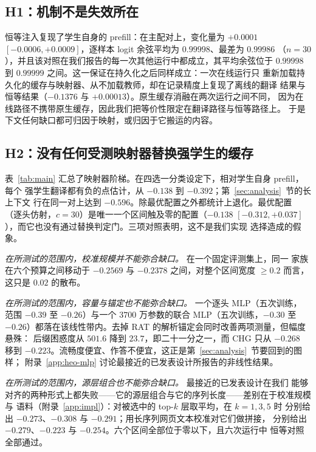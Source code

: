 \documentclass[10pt,a4paper,fontset=fandol]{ctexart}
\begin{document}
\subsection{H1：机制不是失效所在}
\label{sec:h1}

恒等注入复现了学生自身的 prefill：在主配对上，变化量为 $+0.0001$
$[-0.0006,+0.0009]$，逐样本 logit 余弦平均为 $0.99998$、最差为 $0.99986$
（$n{=}30$），并且该对照在我们报告的每一次其他运行中都成立，其平均余弦位于
$0.99998$ 到 $0.99999$ 之间。这一保证在持久化之后同样成立：一次在线运行只
重新加载持久化的缓存与映射器、从不加载教师，却在记录精度上复现了离线的翻译
结果与恒等结果（$-0.1376$ 与 $+0.00013$）。原生缓存消融在两次运行之间不同，
因为在线路径不携带原生缓存，因此我们把等价性限定在翻译路径与恒等路径上。
于是下文任何缺口都可归因于映射，或归因于它搬运的内容。

\subsection{H2：没有任何受测映射器替换强学生的缓存}
\label{sec:h2}

表~\ref{tab:main} 汇总了映射器阶梯。在四选一分类设定下，相对学生自身 prefill，每个
强学生翻译都有负的点估计，从 $-0.138$ 到 $-0.392$；第~\ref{sec:analysis}~节的长上下文
行在同一对上达到 $-0.596$。除最优配置之外都统计上退化。最优配置
（逐头仿射，$c{=}30$）是唯一一个区间触及零的配置（$-0.138$
$[-0.312,+0.037]$），而它也没有通过替换判定门。三项对照表明，这不是我们实现
选择造成的假象。

\emph{在所测试的范围内，校准规模并不能弥合缺口。} 在一个固定评测集上，同一
家族在六个预算之间移动于 $-0.2569$ 与 $-0.2378$ 之间，对整个区间宽度
$\ge 0.2$ 而言，这只是 $0.02$ 的散布。

\emph{在所测试的范围内，容量与锚定也不能弥合缺口。} 一个逐头 MLP（五次训练，
范围 $-0.39$ 至 $-0.26$）与一个 $3700$ 万参数的联合 MLP（五次训练，$-0.30$ 至
$-0.26$）都落在该线性带内。去掉 RAT 的解析锚定会同时改善两项测量，但幅度悬殊：
后缀困惑度从 $501.6$ 降到 $23.7$，即二十一分之一，而 CHG 只从 $-0.268$ 移到
$-0.223$。流畅度便宜、作答不便宜，这正是第~\ref{sec:analysis}~节要回到的图样；
附录~\ref{app:heo-mlp} 讨论最接近的已发表设计所报告的非线性结果。

\emph{在所测试的范围内，源层组合也不能弥合缺口。} 最接近的已发表设计在我们
能够对齐的两种形式上都失败——它的源层组合与它的序列长度——差别在于校准规模与
语料（附录~\ref{app:impl}）：对被选中的 top-$k$ 层取平均，在 $k{=}1,3,5$ 时
分别给出 $-0.273$、$-0.308$ 与 $-0.291$；用长序列网页文本校准对它们做拼接，
分别给出 $-0.279$、$-0.223$ 与 $-0.254$。六个区间全部位于零以下，且六次运行中
恒等对照全部通过。
\end{document}
